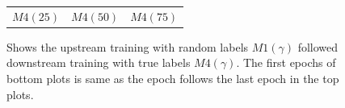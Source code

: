 \begin{figure}[h]
\begin{minipage}{0.99\columnwidth}
\begin{tabular}{ccc}
 $M4(25)$ & $M4(50)$ &  $M4(75)$
\end{tabular}
\end{minipage}
\caption{Shows the upstream training with random labels $M1(\gamma)$ followed downstream training with true labels $M4(\gamma)$. The first epochs of bottom plots is same as the epoch follows the last epoch in the top plots.}
\label{fig:rand-label1}

\end{figure}


\begin{figure}[h]
\begin{minipage}{0.99\columnwidth}
\end{minipage}
\end{figure}
